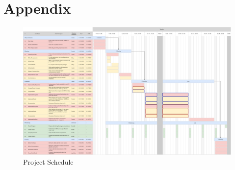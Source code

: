 \chapter{Appendix}
\begin{figure}
  \includegraphics[scale=0.4, angle=270]{data/figures/gantt.pdf}
	\caption{Project Schedule}
	\label{fig:gantt}
\end{figure}
